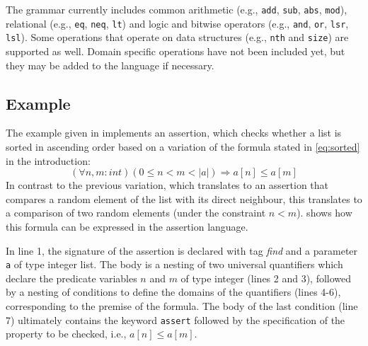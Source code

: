 The grammar currently includes common arithmetic (e.g., \texttt{add}, \texttt{sub}, \texttt{abs}, \texttt{mod}), relational  (e.g., \texttt{eq}, \texttt{neq}, \texttt{lt}) and logic and bitwise operators (e.g., \texttt{and}, \texttt{or}, \texttt{lsr}, \texttt{lsl}). Some operations that operate on data structures (e.g., \texttt{nth} and \texttt{size}) are supported as well. Domain specific operations have not been included yet, but they may be added to the language if necessary. 

\subsection{Example}
The example given in  implements an assertion, which checks whether a list is sorted in ascending order based on a variation of the formula stated in \eqref{eq:sorted} in the introduction:
\begin{equation}\label{eq:sorted_v2}
	(\forall n,m : int) (0 \leq n < m < |a|) \Rightarrow a[n] \leq a[m]
\end{equation}
In contrast to the previous variation, which translates to an assertion that compares a random element of the list with its direct neighbour, this translates to a comparison of two random elements (under the constraint $n < m$).  shows how this formula can be expressed in the assertion language.


In line 1, the signature of the assertion is declared with tag \textit{find} and a parameter \texttt{a} of type integer list. The body is a nesting of two universal quantifiers which declare the predicate variables $n$ and $m$ of type integer (lines 2 and 3), followed by a nesting of conditions to define the domains of the quantifiers (lines 4-6), corresponding to the premise of the formula. The body of the last condition (line 7) ultimately contains the keyword \texttt{assert} followed by the specification of the property to be checked, i.e.,  $a[n] \leq a[m]$.

